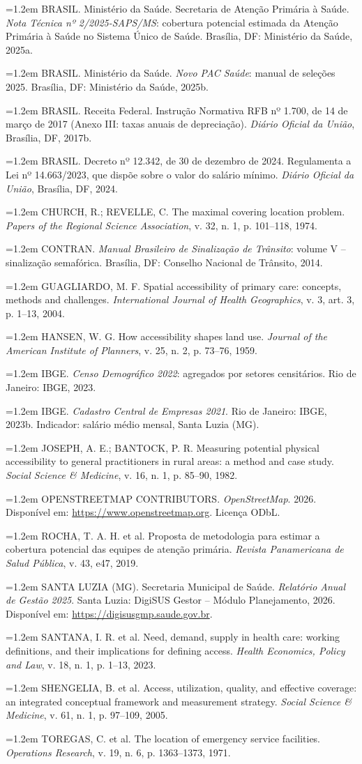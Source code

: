 \documentclass[11pt,a4paper]{article}
\newcommand{\bibentrada}[1]{\par\noindent\hangindent=1.2em\hangafter=1 #1\par\vspace{4pt}}
\begin{document}
\bibentrada{BRASIL. Ministério da Saúde. Secretaria de Atenção Primária à Saúde. \textit{Nota Técnica nº 2/2025-SAPS/MS}: cobertura potencial estimada da Atenção Primária à Saúde no Sistema Único de Saúde. Brasília, DF: Ministério da Saúde, 2025a.}
\bibentrada{BRASIL. Ministério da Saúde. \textit{Novo PAC Saúde}: manual de seleções 2025. Brasília, DF: Ministério da Saúde, 2025b.}
\bibentrada{BRASIL. Receita Federal. Instrução Normativa RFB nº 1.700, de 14 de março de 2017 (Anexo III: taxas anuais de depreciação). \textit{Diário Oficial da União}, Brasília, DF, 2017b.}
\bibentrada{BRASIL. Decreto nº 12.342, de 30 de dezembro de 2024. Regulamenta a Lei nº 14.663/2023, que dispõe sobre o valor do salário mínimo. \textit{Diário Oficial da União}, Brasília, DF, 2024.}
\bibentrada{CHURCH, R.; REVELLE, C. The maximal covering location problem. \textit{Papers of the Regional Science Association}, v. 32, n. 1, p. 101–118, 1974.}
\bibentrada{CONTRAN. \textit{Manual Brasileiro de Sinalização de Trânsito}: volume V – sinalização semafórica. Brasília, DF: Conselho Nacional de Trânsito, 2014.}
\bibentrada{GUAGLIARDO, M. F. Spatial accessibility of primary care: concepts, methods and challenges. \textit{International Journal of Health Geographics}, v. 3, art. 3, p. 1–13, 2004.}
\bibentrada{HANSEN, W. G. How accessibility shapes land use. \textit{Journal of the American Institute of Planners}, v. 25, n. 2, p. 73–76, 1959.}
\bibentrada{IBGE. \textit{Censo Demográfico 2022}: agregados por setores censitários. Rio de Janeiro: IBGE, 2023.}
\bibentrada{IBGE. \textit{Cadastro Central de Empresas 2021}. Rio de Janeiro: IBGE, 2023b. Indicador: salário médio mensal, Santa Luzia (MG).}
\bibentrada{JOSEPH, A. E.; BANTOCK, P. R. Measuring potential physical accessibility to general practitioners in rural areas: a method and case study. \textit{Social Science \& Medicine}, v. 16, n. 1, p. 85–90, 1982.}
\bibentrada{OPENSTREETMAP CONTRIBUTORS. \textit{OpenStreetMap}. 2026. Disponível em: \url{https://www.openstreetmap.org}. Licença ODbL.}
\bibentrada{ROCHA, T. A. H. et al. Proposta de metodologia para estimar a cobertura potencial das equipes de atenção primária. \textit{Revista Panamericana de Salud Pública}, v. 43, e47, 2019.}
\bibentrada{SANTA LUZIA (MG). Secretaria Municipal de Saúde. \textit{Relatório Anual de Gestão 2025}. Santa Luzia: DigiSUS Gestor – Módulo Planejamento, 2026. Disponível em: \url{https://digisusgmp.saude.gov.br}.}
\bibentrada{SANTANA, I. R. et al. Need, demand, supply in health care: working definitions, and their implications for defining access. \textit{Health Economics, Policy and Law}, v. 18, n. 1, p. 1–13, 2023.}
\bibentrada{SHENGELIA, B. et al. Access, utilization, quality, and effective coverage: an integrated conceptual framework and measurement strategy. \textit{Social Science \& Medicine}, v. 61, n. 1, p. 97–109, 2005.}
\bibentrada{TOREGAS, C. et al. The location of emergency service facilities. \textit{Operations Research}, v. 19, n. 6, p. 1363–1373, 1971.}
\end{document}
